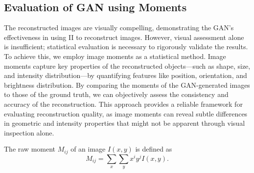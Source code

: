 \subsection{Evaluation of GAN using Moments}
The reconstructed images are visually compelling, demonstrating the GAN's effectiveness in using II to reconstruct images. However, visual assessment alone is insufficient; statistical evaluation is necessary to rigorously validate the results. To achieve this, we employ image moments as a statistical method. Image moments capture key properties of the reconstructed objects—such as shape, size, and intensity distribution—by quantifying features like position, orientation, and brightness distribution. By comparing the moments of the GAN-generated images to those of the ground truth, we can objectively assess the consistency and accuracy of the reconstruction. This approach provides a reliable framework for evaluating reconstruction quality, as image moments can reveal subtle differences in geometric and intensity properties that might not be apparent through visual inspection alone.

The raw moment $M_{ij}$ of an image $I(x, y)$ is defined as \citep{hu1962visual}
\begin{equation}
	M_{ij} = \sum_{x} \sum_{y} x^i y^j I(x, y).
	\label{eqn:Mom}
\end{equation}

